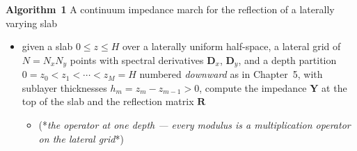 \documentclass[11pt,a4paper]{article}
\newcommand{\bR}{\mathbf{R}}
\newcommand{\bY}{\mathbf{Y}}
\begin{document}
\vspace{3mm}
\noindent\begin{minipage}{\linewidth}
\textbf{Algorithm}~\textbf{1} {\sc A continuum impedance march for the
reflection of a laterally varying slab}\newline
\vspace{2mm}

\begin{itemize}
\item given a slab $0\le z\le H$ over a laterally uniform half-space, a lateral
grid of $N=N_xN_y$ points with spectral derivatives $\mathbf{D}_x$,
$\mathbf{D}_y$, and a depth partition $0=z_0<z_1<\cdots<z_M=H$ numbered
\emph{downward} as in Chapter~5, with sublayer thicknesses
$h_m=z_m-z_{m-1}>0$, compute the impedance $\bY$ at the top of the slab and the
reflection matrix $\bR$

\begin{itemize}
\item (*{\em the operator at one depth --- every modulus is a multiplication
operator on the lateral grid\/}*)
\end{itemize}


\end{itemize}
\end{minipage}
\end{document}
